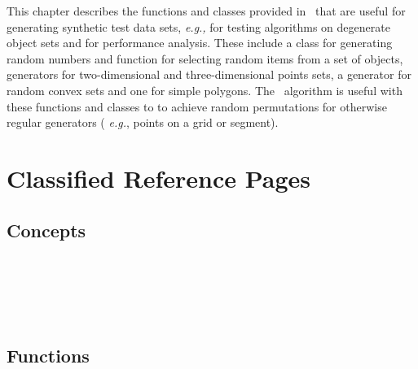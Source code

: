 
This chapter describes the functions and classes provided in \cgal\ that
are useful for generating synthetic test data sets, \textit{e.g.,} for 
testing algorithms on degenerate object sets and for performance analysis.
These include a class for generating random numbers and function for selecting
random items from a set of objects,
generators for two-dimensional and three-dimensional points sets, a generator
for random convex sets and one for simple polygons.  The \stl\ algorithm
 is useful with these functions and classes to
to achieve random permutations for otherwise regular generators (
\textit{e.g.}, points on a grid or segment).


\section{Classified Reference Pages}

\subsection*{Concepts}
 \\
 \\
 \\
 \\

\subsection*{Functions}

 \\
 \\
 \\
 \\
 \\
 \\
 \\
 \\
 \\
 \\

